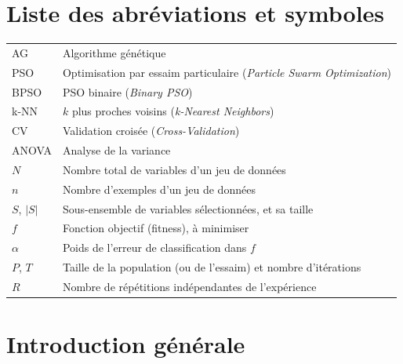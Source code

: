 \documentclass[11pt,a4paper]{report}
\begin{document}
\tableofcontents
\listoffigures
\listoftables

\chapter*{Liste des abréviations et symboles}
\begin{tabular}{@{}ll@{}}
AG    & Algorithme génétique \\
PSO   & Optimisation par essaim particulaire (\emph{Particle Swarm Optimization}) \\
BPSO  & PSO binaire (\emph{Binary PSO}) \\
k-NN  & $k$ plus proches voisins (\emph{k-Nearest Neighbors}) \\
CV    & Validation croisée (\emph{Cross-Validation}) \\
ANOVA & Analyse de la variance \\
$N$   & Nombre total de variables d'un jeu de données \\
$n$   & Nombre d'exemples d'un jeu de données \\
$S$, $|S|$ & Sous-ensemble de variables sélectionnées, et sa taille \\
$f$   & Fonction objectif (fitness), à minimiser \\
$\alpha$ & Poids de l'erreur de classification dans $f$ \\
$P$, $T$ & Taille de la population (ou de l'essaim) et nombre d'itérations \\
$R$   & Nombre de répétitions indépendantes de l'expérience \\
\end{tabular}

\cleardoublepage
{}

\chapter*{Introduction générale}
\end{document}
